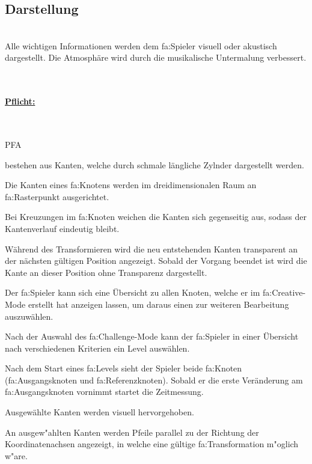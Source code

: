 %
%


\subsection{Darstellung}

%
%
\renewcommand{\K}{}
%
%

~\\
Alle wichtigen Informationen werden dem \gls{fa:Spieler} visuell oder akustisch dargestellt. Die Atmosphäre wird durch die musikalische Untermalung verbessert.

~\\

%
%
\paragraph*{\underline{Pflicht:}}~\\

\begin{ids}{\gls{PFA\K}}

	 bestehen aus Kanten, welche durch schmale längliche Zylnder dargestellt werden.
	
	\id[ 290] Die Kanten eines \gls{fa:Knoten}s werden im dreidimensionalen Raum an \gls{fa:Rasterpunkt} ausgerichtet.
	
	\id[ 300] Bei Kreuzungen im \gls{fa:Knoten} weichen die Kanten sich gegenseitig aus, sodass der Kantenverlauf eindeutig bleibt.
	
	\id[ 310] Während des Transformieren wird die neu entstehenden Kanten transparent an der nächsten gültigen Position angezeigt. Sobald der Vorgang beendet ist wird die Kante an dieser Position ohne Transparenz dargestellt.
	
	\id[ 320] Der \gls{fa:Spieler} kann sich eine Übersicht zu allen Knoten, welche er im \gls{fa:Creative}-Mode erstellt hat anzeigen lassen, um daraus einen zur weiteren Bearbeitung auszuwählen.
	
	\id[ 330] Nach der Auswahl des \gls{fa:Challenge}-Mode kann der \gls{fa:Spieler} in einer Übersicht nach verschiedenen Kriterien ein Level auswählen.
	
	\id[ 340] Nach dem Start eines \gls{fa:Level}s sieht der Spieler beide \gls{fa:Knoten} (\gls{fa:Ausgangsknoten} und \gls{fa:Referenzknoten}). Sobald er die erste Veränderung am \gls{fa:Ausgangsknoten} vornimmt startet die Zeitmessung.
	
	\id[ 350] Ausgewählte Kanten werden visuell hervorgehoben.
	
	\id[ 355] An ausgew{"a}hlten Kanten werden Pfeile parallel zu der Richtung der Koordinatenachsen angezeigt, in welche eine gültige \gls{fa:Transformation} m{"o}glich w{"a}re.
	
\end{ids}


